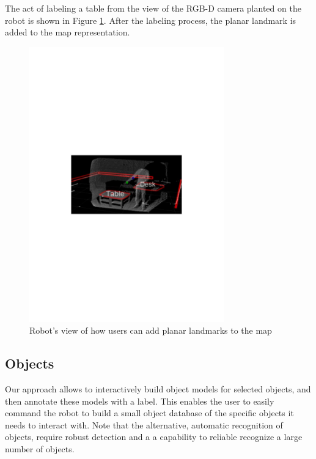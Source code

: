 The act of labeling a table from the view of the RGB-D camera planted on the robot is shown in Figure \ref{fig:pointing_table_desk}. After the labeling process, the planar landmark is added to the map representation.

\begin{figure}[ht!]
\centering
\includegraphics[width=0.75\textwidth]{pics/pointing_table_desk}
\caption{Robot's view of how users can add planar landmarks to the map}
\label{fig:pointing_table_desk}
\end{figure}

\subsection{Objects}
\label{sec:map_objects}

Our approach allows to interactively build object models for selected objects, and then annotate these models with a label. This enables the user to easily command the robot to build a small object database of the specific objects it needs to interact with. Note that the alternative, automatic recognition of objects, require robust detection and a a capability to reliable recognize a large number of objects.

